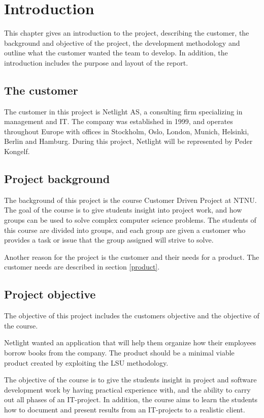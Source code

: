 \chapter{Introduction}
\label{chap:Introduction}

This chapter gives an introduction to the project, describing the customer, the background and objective of the project, the development methodology and outline what the customer wanted the team to develop. In addition, the introduction includes the purpose and layout of the report. 

\section{The customer}
\label{customer}
The customer in this project is Netlight AS, a consulting firm specializing in management and IT. The company was established in 1999, and operates throughout Europe with offices in Stockholm, Oslo, London, Munich, Helsinki, Berlin and Hamburg. \cite{netlight} During this project, Netlight will be represented by Peder Kongelf.

\section{Project background}
\label{background}
The background of this project is the course Customer Driven Project at \gls{NTNU}. The goal of the course is to give students insight into project work, and how groups can be used to solve complex computer science problems. The students of this course are divided into groups, and each group are given a customer who provides a task or issue that the group assigned will strive to solve.

Another reason for the project is the customer and their needs for a product. The customer needs are described in section \ref{product}. 
\section{Project objective}
\label{project-objective}
The objective of this project includes the customers objective and the objective of the course. 

Netlight wanted an application that will help them organize how their employees borrow books from the company. The product should be a minimal viable product created by exploiting the \gls{LSU} methodology.

The objective of the course is to give the students insight in project and software development work by having practical experience with, and the ability to carry out all phases of an IT-project. In addition, the course aims to learn the students how to document and present results from an IT-projects to a realistic client.\cite{tdt4290-ntnu}

